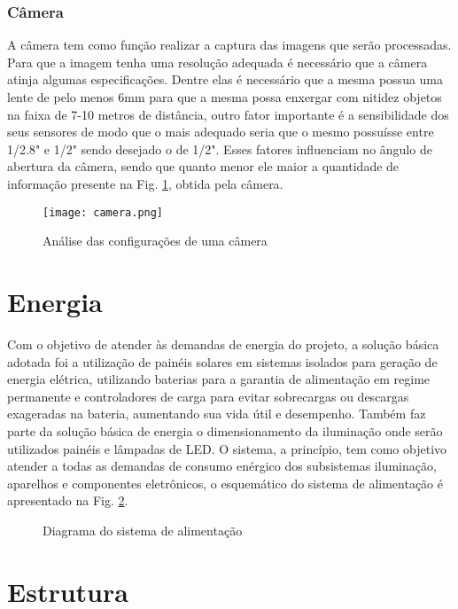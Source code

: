 \subsubsection{Câmera} 

A câmera tem como função realizar a captura das imagens que serão processadas.  Para que a imagem tenha uma resolução adequada é necessário que a câmera atinja algumas especificações. Dentre elas é necessário que a mesma possua uma lente de pelo menos 6mm para que a mesma possa enxergar com nitidez objetos na faixa de 7-10 metros de distância, outro fator importante é a sensibilidade dos seus sensores de modo que o mais adequado seria que o mesmo possuísse entre 1/2.8" e 1/2" sendo desejado o de 1/2". Esses fatores influenciam no ângulo de abertura da câmera, sendo que quanto menor ele maior a quantidade de informação presente na Fig. \ref{fig:camera}, obtida pela câmera.

\begin{figure}[!htb]
    \centering
        \texttt{[image: camera.png]} 
    \caption{Análise das configurações de uma câmera}
    \label{fig:camera}
\end{figure}

\section{Energia}

Com o objetivo de atender às demandas de energia do projeto, a solução básica adotada foi a utilização de painéis solares em sistemas isolados para geração de energia elétrica, utilizando baterias para a garantia de alimentação em regime permanente e controladores de carga para evitar sobrecargas ou descargas exageradas na bateria, aumentando sua vida útil e desempenho. Também faz parte da solução básica de energia o dimensionamento da iluminação onde serão utilizados painéis e lâmpadas de LED. O sistema, a princípio, tem como objetivo atender a todas as demandas de consumo enérgico dos subsistemas iluminação, aparelhos e componentes eletrônicos, o esquemático do sistema de alimentação é apresentado na Fig. \ref{fig:diagrama_energia}.

\begin{figure}[!htb]
	\caption{\label{fig:diagrama_energia} Diagrama do sistema de alimentação}
\end{figure}

\section{Estrutura}

